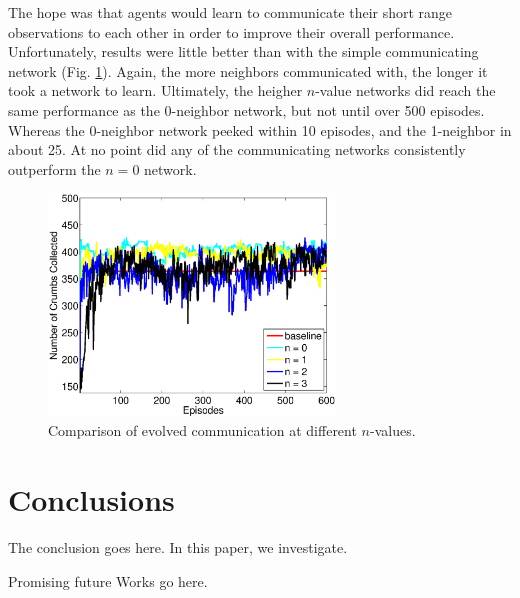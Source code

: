 \documentclass[conference]{IEEEtran}
\begin{document}
The hope was that agents would learn to communicate their short range observations to each other in order to improve their overall performance.
Unfortunately, results were little better than with the simple communicating network (Fig. \ref{neroevolution:evolved_comunication_results}). 
Again, the more neighbors communicated with, the longer it took a network to learn. Ultimately, the heigher $n$-value networks did reach the same performance as the 0-neighbor network, but not until over 500 episodes. Whereas the 0-neighbor network peeked within 10 episodes, and the 1-neighbor in about 25. At no point did any of the communicating networks consistently outperform the $n=0$ network. 

\begin{figure}[t]
\centering
\includegraphics[width=3.0in]{./figures/neroevolution/emerg.eps}
\caption{Comparison of evolved communication at different $n$-values. }
\label{neroevolution:evolved_comunication_results}
\end{figure}



\section{Conclusions} \label{conclusion}
The conclusion goes here. In this paper, we investigate.

Promising future Works go here.


\end{document}
